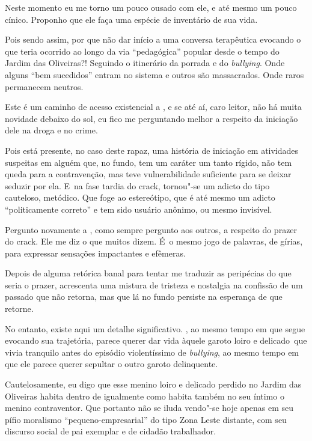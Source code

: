 Neste momento eu me torno um pouco ousado com ele, e até mesmo um pouco
cínico. Proponho que ele faça uma espécie de inventário de sua vida.

Pois sendo assim, por que não dar início a uma conversa terapêutica
evocando o que teria ocorrido ao longo da via ``pedagógica'' popular
desde o tempo do Jardim das Oliveiras?! Seguindo o itinerário da porrada
e do \emph{bullying}. Onde alguns ``bem sucedidos'' entram no sistema e outros
são massacrados. Onde raros permanecem neutros.

Este é um caminho de acesso existencial a , e se até aí, caro leitor,
não há muita novidade debaixo do sol, eu fico me perguntando melhor a
respeito da iniciação dele na droga e no crime.

Pois está presente, no caso deste rapaz, uma história de iniciação em
atividades suspeitas em alguém que, no fundo, tem um caráter um tanto
rígido, não tem queda para a contravenção, mas teve vulnerabilidade
suficiente para se deixar seduzir por ela. E~na fase tardia do crack, 
tornou"-se um adicto do tipo cauteloso, metódico. Que foge ao
estereótipo, que é até mesmo um adicto ``politicamente correto'' e tem
sido usuário anônimo, ou mesmo invisível.

Pergunto novamente a , como sempre pergunto aos outros, a respeito do
prazer do crack. Ele me diz o que muitos dizem. É~o mesmo jogo de
palavras, de gírias, para expressar sensações impactantes e efêmeras.

Depois de alguma retórica banal para tentar me traduzir as peripécias do
que seria o prazer,  acrescenta uma mistura de tristeza e nostalgia na
confissão de um passado que não retorna, mas que lá no fundo persiste na
esperança de que retorne.

No entanto, existe aqui um detalhe significativo. , ao mesmo tempo em
que segue evocando sua trajetória, parece querer dar vida àquele garoto
loiro e delicado~que vivia tranquilo antes do episódio violentíssimo de
\emph{bullying}, ao mesmo tempo em que ele parece querer sepultar o
outro garoto  delinquente.

Cautelosamente, eu digo que esse menino loiro e delicado perdido no
Jardim das Oliveiras habita dentro de  igualmente como habita também
no seu íntimo o menino contraventor. Que  portanto não se iluda
vendo"-se hoje apenas em seu pífio moralismo ``pequeno-empresarial'' do
tipo Zona Leste distante, com seu discurso social de pai exemplar e de
cidadão trabalhador.

